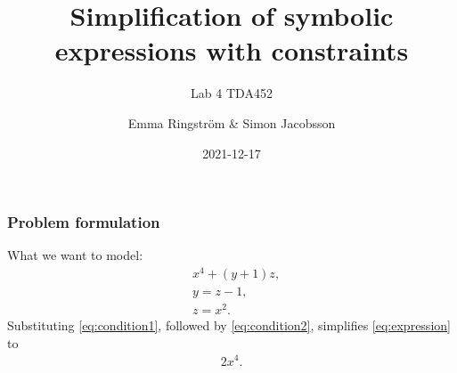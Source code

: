 \documentclass[english, 12pt, t, aspectratio=169]{beamer}
\title{Simplification of symbolic expressions with constraints}
\subtitle{Lab 4 TDA452}
\institute{Chalmers University of Technology}
\author{Emma Ringström \& Simon Jacobsson}
\date{2021-12-17}
\begin{document}
\begin{frame}
	\titlepage
\end{frame}

\begin{frame}[t]
	\frametitle{Problem formulation}
	What we want to model:
	\begin{align}
		&x^4 + (y + 1) z, \label{eq:expression}\\
		&y = z - 1, \label{eq:condition1}\\
		&z = x^2. \label{eq:condition2}
	\end{align}
	Substituting \eqref{eq:condition1}, followed by \eqref{eq:condition2}, simplifies \eqref{eq:expression} to
	\begin{align}
		2 x^4.
	\end{align}
	
\end{frame}
\end{document}
